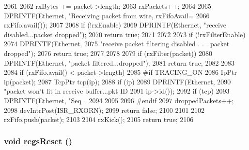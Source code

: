 \begin{DoxyCode}
2061 {
2062     rxBytes += packet->length;
2063     rxPackets++;
2064 
2065     DPRINTF(Ethernet, "Receiving packet from wire, rxFifoAvail=%
2066             rxFifo.avail());
2067 
2068     if (!rxEnable) {
2069         DPRINTF(Ethernet, "receive disabled...packet dropped\n");
2070         return true;
2071     }
2072 
2073     if (!rxFilterEnable) {
2074         DPRINTF(Ethernet,
2075             "receive packet filtering disabled . . . packet dropped\n");
2076         return true;
2077     }
2078 
2079     if (rxFilter(packet)) {
2080         DPRINTF(Ethernet, "packet filtered...dropped\n");
2081         return true;
2082     }
2083 
2084     if (rxFifo.avail() < packet->length) {
2085 #if TRACING_ON
2086         IpPtr ip(packet);
2087         TcpPtr tcp(ip);
2088         if (ip) {
2089             DPRINTF(Ethernet,
2090                     "packet won't fit in receive buffer...pkt ID %
2091                     ip->id());
2092             if (tcp) {
2093                 DPRINTF(Ethernet, "Seq=%
2094             }
2095         }
2096 #endif
2097         droppedPackets++;
2098         devIntrPost(ISR_RXORN);
2099         return false;
2100     }
2101 
2102     rxFifo.push(packet);
2103 
2104     rxKick();
2105     return true;
2106 }
\end{DoxyCode}
\hypertarget{classNSGigE_a95f08ef8a29a3d148385bd455cb58f49}{
\subsubsection[{regsReset}]{\setlength{\rightskip}{0pt plus 5cm}void regsReset ()}}
\label{classNSGigE_a95f08ef8a29a3d148385bd455cb58f49}




